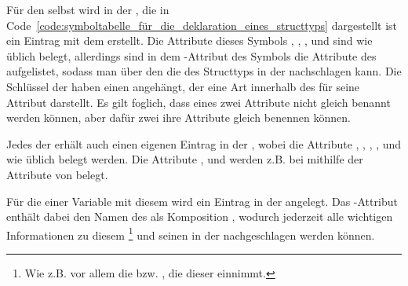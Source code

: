 Für den  selbst wird in der , die in Code~\ref{code:symboltabelle_für_die_deklaration_eines_structtyps} dargestellt ist ein Eintrag mit dem   erstellt. Die Attribute dieses Symbols , ,  ,  und  sind wie üblich belegt, allerdings sind in dem -Attribut des Symbols die Attribute des   aufgelistet, sodass man über den   die   des Structtyps in der   nachschlagen kann. Die Schlüssel der  haben einen   angehängt, der eine Art  innerhalb des  für seine Attribut darstellt. Es gilt foglich, dass  eines  zwei Attribute nicht gleich benannt werden können, aber dafür zwei   ihre Attribute gleich benennen können.

Jedes der   erhält auch einen eigenen Eintrag in der , wobei die Attribute , ,  , ,  und  wie üblich belegt werden. Die Attribute ,  und  werden z.B. bei  mithilfe der Attribute von \smalltt{Alloc(Writeable(), ArrayDecl([Num('2')], IntType('int')), Name('ar'))])} belegt.

Für die  einer Variable  mit diesem   wird ein Eintrag in der  angelegt. Das -Attribut enthält dabei den Namen des  als Komposition , wodurch jederzeit alle wichtigen Informationen zu diesem \footnote{Wie z.B. vor allem die  bzw. , die dieser  einnimmt.} und seinen  in der   nachgeschlagen werden können.

